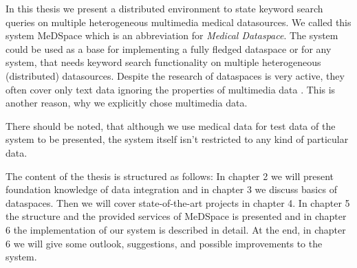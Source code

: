 
In this thesis we present a distributed environment to state keyword search queries on multiple heterogeneous multimedia medical datasources. We called this system MeDSpace which is an abbreviation for \emph{Medical Dataspace}. The system could be used as a base for implementing a fully fledged dataspace or for any system, that needs keyword search functionality on multiple heterogeneous (distributed) datasources. Despite the research of dataspaces is very active, they often cover only text data ignoring the properties of multimedia data \cite{6167826}. This is another reason, why we explicitly chose multimedia data.

There should be noted, that although we use medical data for test data of the system to be presented, the system itself isn't restricted to any kind of particular data.

The content of the thesis is structured as follows: In chapter 2 we will present foundation knowledge of data integration and in chapter 3 we discuss basics of dataspaces. Then we will cover state-of-the-art projects in chapter 4. In chapter 5 the structure and the provided services of MeDSpace is presented and in chapter 6 the implementation of our system is described in detail. At the end, in chapter 6 we will give some outlook, suggestions, and possible improvements to the system. 
